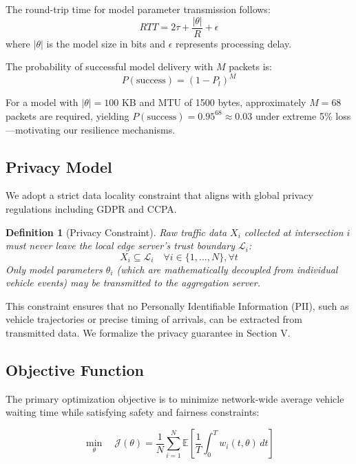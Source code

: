 \documentclass[conference]{IEEEtran}
\newtheorem{definition}{Definition}
\begin{document}
The round-trip time for model parameter transmission follows:
\begin{equation}
RTT = 2\tau + \frac{|\theta|}{R} + \epsilon
\end{equation}
where $|\theta|$ is the model size in bits and $\epsilon$ represents processing delay.

The probability of successful model delivery with $M$ packets is:
\begin{equation}
P(\text{success}) = (1 - P_l)^M
\end{equation}

For a model with $|\theta| = 100$ KB and MTU of 1500 bytes, approximately $M = 68$ packets are required, yielding $P(\text{success}) = 0.95^{68} \approx 0.03$ under extreme 5\% loss---motivating our resilience mechanisms.

\subsection{Privacy Model}
We adopt a strict data locality constraint that aligns with global privacy regulations including GDPR and CCPA.

\begin{definition}[Privacy Constraint]
Raw traffic data $X_i$ collected at intersection $i$ must never leave the local edge server's trust boundary $\mathcal{L}_i$:
\begin{equation}
X_i \subseteq \mathcal{L}_i \quad \forall i \in \{1, ..., N\}, \forall t
\end{equation}
Only model parameters $\theta_i$ (which are mathematically decoupled from individual vehicle events) may be transmitted to the aggregation server.
\end{definition}

This constraint ensures that no Personally Identifiable Information (PII), such as vehicle trajectories or precise timing of arrivals, can be extracted from transmitted data. We formalize the privacy guarantee in Section V.

\subsection{Objective Function}
The primary optimization objective is to minimize network-wide average vehicle waiting time while satisfying safety and fairness constraints:

\begin{equation}
\min_\theta \quad \mathcal{J}(\theta) = \frac{1}{N} \sum_{i=1}^{N} \mathbb{E}\left[\frac{1}{T} \int_0^T w_i(t, \theta) \, dt\right]
\end{equation}
\end{document}
